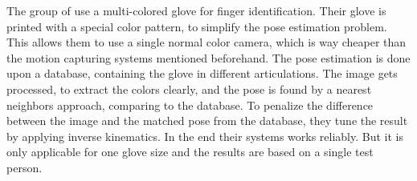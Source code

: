 The group of \cite{Wang:2009:RTH} use a multi-colored glove for finger identification. Their glove is printed with a special color pattern, to simplify the pose estimation problem. This allows them to use a single normal color camera, which is way cheaper than the motion capturing systems mentioned beforehand. The pose estimation is done upon a database, containing the glove in different articulations. The image gets processed, to extract the colors clearly, and the pose is found by a nearest neighbors approach, comparing to the database. To penalize the difference between the image and the matched pose from the database, they tune the result by applying inverse kinematics. In the end their systems works reliably. But it is only applicable for one glove size and the results are based on a single test person.\\

